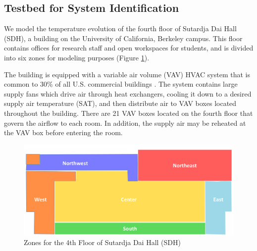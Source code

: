 \documentclass[../thesis.tex]{subfiles}
\begin{document}
\subsection{Testbed for System Identification}
We model the temperature evolution of the fourth floor of Sutardja Dai Hall (SDH), a building on the University of California, Berkeley campus. This floor contains offices for research staff and open workspaces for students, and is divided into six zones for modeling purposes (Figure \ref{fig:floor_plan}).

The building is equipped with a variable air volume (VAV) HVAC system that is common to 30\% of all U.S. commercial buildings \cite{VAV}. The system contains large supply fans which drive air through heat exchangers, cooling it down to a desired supply air temperature (SAT), and then distribute air to VAV boxes located throughout the building. There are 21 VAV boxes located on the fourth floor that govern the airflow to each room. In addition, the supply air may be reheated at the VAV box before entering the room. 
\begin{figure}[hbtp]
\centering
\vspace*{-0.4cm}
\includegraphics[scale=0.30]{chapters/building_model/figures/FloorPlan.png}
\vspace*{-0.05cm}
\caption{Zones for the 4th Floor of Sutardja Dai Hall (SDH)}
\label{fig:floor_plan}
\vspace*{-0.45cm}
\end{figure}

\end{document}
